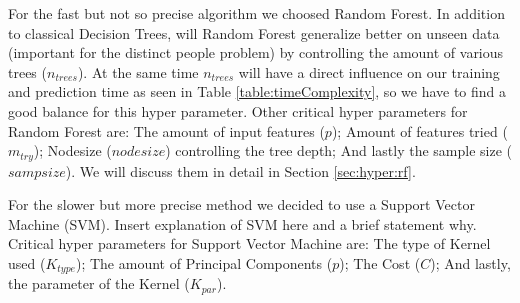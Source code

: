 \documentclass[conference]{IEEEtran}
\begin{document}
\textcolor{til}{
    For the fast but not so precise algorithm we choosed Random Forest. In addition to classical Decision Trees, will Random Forest generalize better on unseen data (important for the distinct people problem) by controlling the amount of various trees ($n_{trees}$). At the same time $n_{trees}$ will have a direct influence on our training and prediction time as seen in Table \ref{table:timeComplexity}, so we have to find a good balance for this hyper parameter. Other critical hyper parameters for Random Forest are: The amount of input features ($p$); Amount of features tried ($m_{try}$); Nodesize (${nodesize}$) controlling the tree depth; And lastly the sample size (${sampsize}$). We will discuss them in detail in Section \ref{sec:hyper:rf}.}

\textcolor{maxim}{
    For the slower but more precise method we decided to use a Support Vector Machine (SVM).
    Insert explanation of SVM here and a brief statement why.
}
\textcolor{maxim}{
    Critical hyper parameters for Support Vector Machine are: The type of Kernel used ($K_{type}$); The amount of Principal Components ($p$); The Cost ($C$); And lastly, the parameter of the Kernel ($K_{par}$).
}


\end{document}
